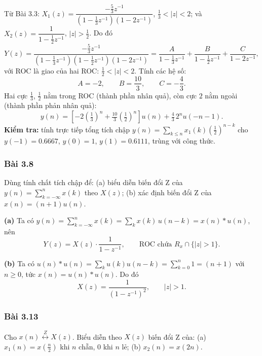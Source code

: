 \documentclass[12pt,a4paper]{article}
\newcommand{\zpair}{\overset{Z}{\longleftrightarrow}}
\begin{document}
Từ Bài 3.3: $X_1(z) = \dfrac{-\frac{5}{3}z^{-1}}{\left(1 - \frac{1}{3}z^{-1}\right)(1 - 2z^{-1})}$, $\frac{1}{3} < |z| < 2$; và $X_2(z) = \dfrac{1}{1 - \frac{1}{2}z^{-1}}$, $|z| > \frac{1}{2}$. Do đó
\[
    Y(z) = \frac{-\frac{5}{3}z^{-1}}{\left(1 - \frac{1}{3}z^{-1}\right)\left(1 - \frac{1}{2}z^{-1}\right)(1 - 2z^{-1})}
    = \frac{A}{1 - \frac{1}{3}z^{-1}} + \frac{B}{1 - \frac{1}{2}z^{-1}} + \frac{C}{1 - 2z^{-1}},
\]
với ROC là giao của hai ROC: $\frac{1}{2} < |z| < 2$. Tính các hệ số:
\[
    A = -2, \qquad B = \frac{10}{3}, \qquad C = -\frac{4}{3}.
\]
Hai cực $\frac{1}{3}$, $\frac{1}{2}$ nằm trong ROC (thành phần nhân quả), còn cực $2$ nằm ngoài (thành phần phản nhân quả):
\begin{equation}
    y(n) = \left[-2\left(\tfrac{1}{3}\right)^n + \tfrac{10}{3}\left(\tfrac{1}{2}\right)^n\right] u(n) + \tfrac{4}{3}\, 2^n u(-n-1).
\end{equation}
\textbf{Kiểm tra:} tính trực tiếp tổng tích chập $y(n) = \sum_{k \le n} x_1(k)\left(\frac{1}{2}\right)^{n-k}$ cho $y(-1) = 0.6667$, $y(0) = 1$, $y(1) = 0.6111$, trùng với công thức.

\subsubsection*{Bài 3.8}
\begin{mdframed}[style=exbox]
Dùng tính chất tích chập để: (a) biểu diễn biến đổi Z của $y(n) = \sum_{k=-\infty}^{n} x(k)$ theo $X(z)$; (b) xác định biến đổi Z của $x(n) = (n+1)u(n)$.
\end{mdframed}

\textbf{(a)} Ta có $y(n) = \sum_{k=-\infty}^{n} x(k) = \sum_{k} x(k)\, u(n-k) = x(n) * u(n)$, nên
\[
    Y(z) = X(z) \cdot \frac{1}{1 - z^{-1}}, \qquad \text{ROC chứa } R_x \cap \{|z| > 1\}.
\]

\textbf{(b)} Ta có $u(n) * u(n) = \sum_{k} u(k)u(n-k) = \sum_{k=0}^{n} 1 = (n+1)$ với $n \ge 0$, tức $x(n) = u(n) * u(n)$. Do đó
\[
    X(z) = \frac{1}{(1 - z^{-1})^2}, \qquad |z| > 1.
\]

\subsubsection*{Bài 3.13}
\begin{mdframed}[style=exbox]
Cho $x(n) \zpair X(z)$. Biểu diễn theo $X(z)$ biến đổi Z của: (a) $x_1(n) = x\left(\frac{n}{2}\right)$ khi $n$ chẵn, $0$ khi $n$ lẻ; (b) $x_2(n) = x(2n)$.
\end{mdframed}
\end{document}
